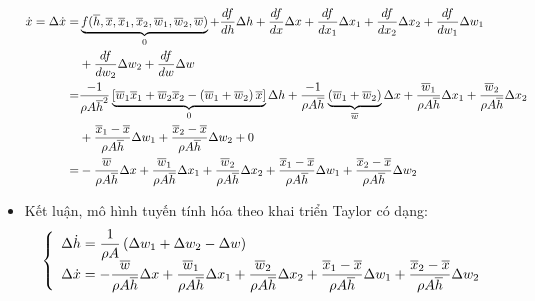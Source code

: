 \begin{itemize}
\begin{align*}
                \dot{x} = \Delta \dot{x} = & \underbrace{f(\overline{h}, \overline{x}, \overline{x}_1, \overline{x}_2, \overline{w}_1, \overline{w}_2, \overline{w})}_{0} + \dfrac{df}{dh}\Delta h + \dfrac{df}{dx}\Delta x + \dfrac{df}{dx_1}\Delta x_1 + \dfrac{df}{dx_2}\Delta x_2 + \dfrac{df}{dw_1}\Delta w_1 \\
                & + \dfrac{df}{dw_2}\Delta w_2 + \dfrac{df}{dw}\Delta w \\
                = & \dfrac{-1}{\rho A \overline{h}^2} \underbrace{\left[{\overline{w}_1 \overline{x}_1 + \overline{w}_2 \overline{x}_2 - \left({\overline{w}_1 + \overline{w}_2}\right)\overline{x}}\right]}_{0} \Delta h + \dfrac{-1}{\rho A \overline{h}} \underbrace{\left({\overline{w}_1 + \overline{w}_2}\right)}_{\overline{w}} \Delta x + \dfrac{\overline{w}_1}{\rho A \overline{h}} \Delta x_1 + \dfrac{\overline{w}_2}{\rho A \overline{h}} \Delta x_2 \\
                & + \dfrac{\overline{x}_1 - \overline{x}}{\rho A \overline{h}} \Delta w_1 + \dfrac{\overline{x}_2 - \overline{x}}{\rho A \overline{h}} \Delta w_2 + 0\\
                = & - \dfrac{\overline{w}}{\rho A \overline{h}} \Delta x + \dfrac{\overline{w}_1}{\rho A \overline{h}} \Delta x_1 + \dfrac{\overline{w}_2}{\rho A \overline{h}} \Delta x_2 + \dfrac{\overline{x}_1 - \overline{x}}{\rho A \overline{h}} \Delta w_1 + \dfrac{\overline{x}_2 - \overline{x}}{\rho A \overline{h}} \Delta w_2
            \end{align*}
        \item Kết luận, mô hình tuyến tính hóa theo khai triển Taylor có dạng:
            \begin{align*}
                \left\{\begin{array}{l}
                    \Delta \dot{h} = \dfrac{1}{\rho A} \left({\Delta w_1 + \Delta w_2 - \Delta w}\right)\\
                    \Delta \dot{x} = - \dfrac{\overline{w}}{\rho A \overline{h}} \Delta x + \dfrac{\overline{w}_1}{\rho A \overline{h}} \Delta x_1 + \dfrac{\overline{w}_2}{\rho A \overline{h}} \Delta x_2 + \dfrac{\overline{x}_1 - \overline{x}}{\rho A \overline{h}} \Delta w_1 + \dfrac{\overline{x}_2 - \overline{x}}{\rho A \overline{h}} \Delta w_2
                \end{array}\right.
            \end{align*}
    \end{itemize}

